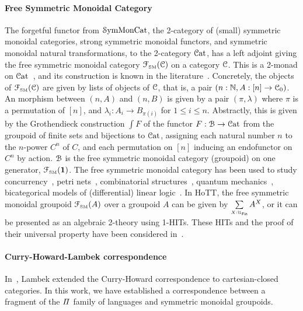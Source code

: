 \paragraph{Free Symmetric Monoidal Category} The forgetful functor from $\SymMonCat$, the 2-category of (small)
symmetric monoidal categories, strong symmetric monoidal functors, and symmetric monoidal natural transformations, to
the 2-category $\CatCat$, has a left adjoint giving the free symmetric monoidal category $\FSM[\CCat{C}]$ on a category
$\CCat{C}$. This is a 2-monad on $\CatCat$~\cite{blackwellTwodimensionalMonadTheory1989}, and its construction is known
in the literature~\cite{abramskyAbstractScalarsLoops2005}. Concretely, the objects of $\FSM[\CCat{C}]$ are given by
lists of objects of $\CCat{C}$, that is, a pair $(n:\Nat, A:[n] \to \CCat{C}_{0})$. An morphism between $(n,A)$ and
$(n,B)$ is given by a pair $(\pi,\lambda)$ where $\pi$ is a permutation of $[n]$, and
$\lambda_{i} : A_{i} \to B_{\pi(i)}$ for $1 \leq i \leq n$. Abstractly, this is given by the Grothendieck construction
$\int F$ of the functor $F : \BFin \to \CatCat$ from the groupoid of finite sets and bijections to $\CatCat$, assigning
each natural number $n$ to the $n$-power $C^{n}$ of $C$, and each permutation on $[n]$ inducing an endofunctor on
$C^{n}$ by action. $\BFin$ is the free symmetric monoidal category (groupoid) on one generator, $\FSM[\unit]$. The free
symmetric monoidal category has been used to study concurrency~\cite{hylandSymmetricMonoidalSketches2004}, petri
nets~\cite{baezCategoriesNets2021}, combinatorial structures~\cite{fioreCartesianClosedBicategory2008}, quantum
mechanics~\cite{abramskyAbstractScalarsLoops2005}, bicategorical models of (differential) linear
logic~\cite{melliesTemplateGamesDifferential2019}. In HoTT, the free symmetric monoidal groupoid $\FSM[A]$ over a
groupoid $A$ can be given by $\dsum{X:\UFin}{A^{X}}$, or it can be presented as an algebraic 2-theory using 1-HITs.
These HITs and the proof of their universal property have been considered
in~\citet*{piceghelloCoherenceSymmetricMonoidal2019,choudhuryFinitemultisetConstructionHoTT2019}.

\paragraph{Curry-Howard-Lambek correspondence} In~\citet{curryCurryEssaysCombinatory1980}, Lambek extended the
Curry-Howard correspondence to cartesian-closed categories. In this work, we have established a correspondence between a
fragment of the $\mathit{\Pi}$ family of languages and symmetric monoidal groupoids.

